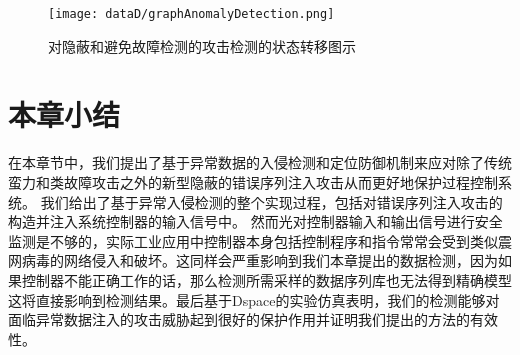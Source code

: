 	\begin{figure}[!htb]
		\centering
		\texttt{[image: dataD/graphAnomalyDetection.png]}
		\caption{对隐蔽和避免故障检测的攻击检测的状态转移图示}
		\label{fig120}
	\end{figure}

\section{本章小结}
\label{sec:insertimage}

在本章节中，我们提出了基于异常数据的入侵检测和定位防御机制来应对除了传统蛮力和类故障攻击之外的新型隐蔽的错误序列注入攻击从而更好地保护过程控制系统。 我们给出了基于异常入侵检测的整个实现过程，包括对错误序列注入攻击的构造并注入系统控制器的输入信号中。 然而光对控制器输入和输出信号进行安全监测是不够的，实际工业应用中控制器本身包括控制程序和指令常常会受到类似震网病毒的网络侵入和破坏。这同样会严重影响到我们本章提出的数据检测，因为如果控制器不能正确工作的话，那么检测所需采样的数据序列库也无法得到精确模型这将直接影响到检测结果。最后基于Dspace的实验仿真表明，我们的检测能够对面临异常数据注入的攻击威胁起到很好的保护作用并证明我们提出的方法的有效性。
